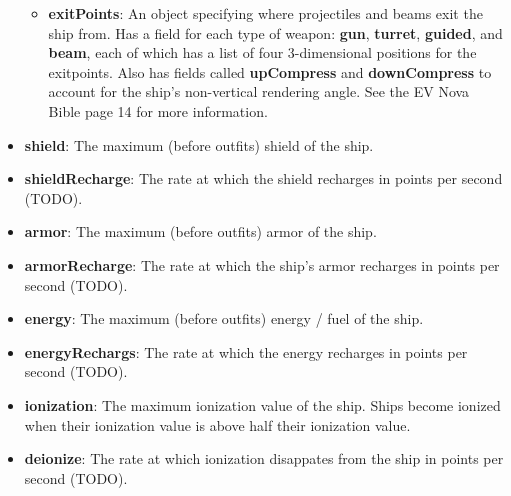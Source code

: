 \documentclass{article}
\begin{document}
\begin{itemize}
\begin{itemize}
  \item{\textbf{exitPoints}}:\label{exitpoints} An object specifying where projectiles and beams exit the ship from. Has a field for each type of weapon: \textbf{gun}, \textbf{turret}, \textbf{guided}, and \textbf{beam}, each of which has a list of four 3-dimensional positions for the exitpoints. Also has fields called \textbf{upCompress} and \textbf{downCompress} to account for the ship's non-vertical rendering angle. See the EV Nova Bible page 14 for more information.

  \end{itemize}

\item{\textbf{shield}}: The maximum (before outfits) shield of the ship.
\item{\textbf{shieldRecharge}}: The rate at which the shield recharges in points per second (TODO).
\item{\textbf{armor}}: The maximum (before outfits) armor of the ship.
\item{\textbf{armorRecharge}}: The rate at which the ship's armor recharges in points per second (TODO).
\item{\textbf{energy}}: The maximum (before outfits) energy / fuel of the ship.
\item{\textbf{energyRechargs}}: The rate at which the energy recharges in points per second (TODO).
\item{\textbf{ionization}}: The maximum ionization value of the ship. Ships become ionized when their ionization value is above half their ionization value.
\item{\textbf{deionize}}: The rate at which ionization disappates from the ship in points per second (TODO).


\end{itemize}
\end{document}
